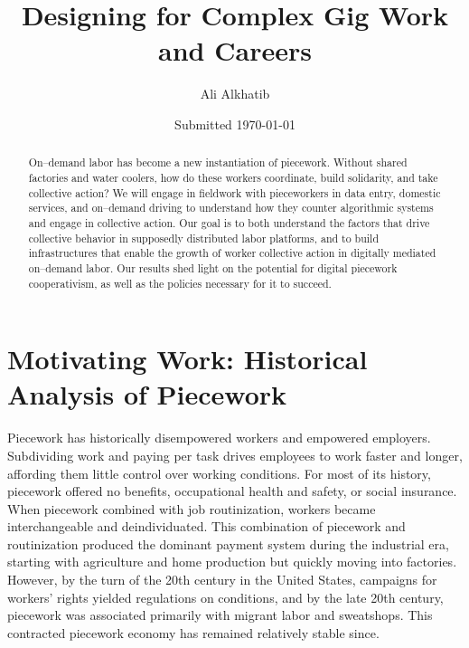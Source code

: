 \documentclass{article}
\title{Designing for Complex Gig Work and Careers}
\author{Ali Alkhatib}
\date{Submitted \today}
\newcommand{\topic}[1]{{\color{Blue}#1}} %
\begin{document}
  \begin{abstract}
On--demand labor has become a new instantiation of piecework.
Without shared factories and water coolers,
how do these workers coordinate,
build solidarity,
and take collective action?
We will engage in fieldwork with pieceworkers in data entry,
domestic services,
and on--demand driving to understand how they counter algorithmic systems and engage in collective action.
Our goal is to both understand the factors that drive collective behavior in supposedly distributed labor platforms,
and to build infrastructures that enable the growth of worker collective action in digitally mediated on--demand labor.
Our results shed light on the potential for digital piecework cooperativism,
as well as the policies necessary for it to succeed. %
  \end{abstract}


\section*{Motivating Work: Historical Analysis of Piecework}


\topic{Piecework has historically disempowered workers and empowered employers.}
Subdividing work and paying per task drives employees to work faster and longer,
affording them little control over working conditions.
For most of its history, piecework offered no benefits, occupational health and safety, or social insurance.
When piecework combined with job routinization, workers became interchangeable and deindividuated.
This combination of piecework and routinization produced the dominant payment system during the industrial era,
starting with agriculture and home production but quickly moving into factories.
However, by the turn of the 20th century in the United States,
campaigns for workers' rights yielded regulations on conditions, and by the late 20th century,
piecework was associated primarily with migrant labor and sweatshops.
This contracted piecework economy has remained relatively stable since.
\end{document}
